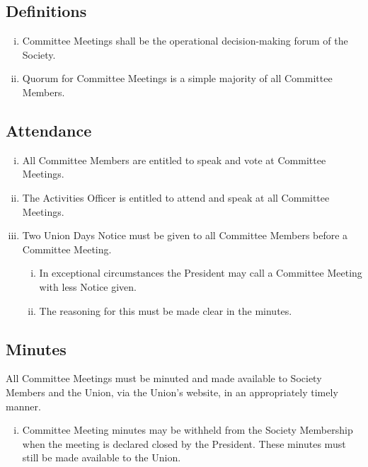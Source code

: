 \subsection{Definitions}
\begin{enumerate}[i.]
    \item Committee Meetings shall be the operational decision-making forum of the Society.
    \item Quorum for Committee Meetings is a simple majority of all Committee Members.
\end{enumerate}

\subsection{Attendance}
\begin{enumerate}[i.]
    \item All Committee Members are entitled to speak and vote at Committee Meetings.
    \item The Activities Officer is entitled to attend and speak at all Committee Meetings.
    \item Two Union Days Notice must be given to all Committee Members before a Committee Meeting.
    \begin{enumerate}[i.]
        \item In exceptional circumstances the President may call a Committee Meeting with less Notice given.
        \item The reasoning for this must be made clear in the minutes.
    \end{enumerate}
\end{enumerate}

\subsection{Minutes}
All Committee Meetings must be minuted and made available to Society Members and the Union, via the Union’s website, in an appropriately timely manner.
\begin{enumerate}[i.]
    \item Committee Meeting minutes may be withheld from the Society Membership when the meeting is declared closed by the President. These minutes must still be made available to the Union.
\end{enumerate}